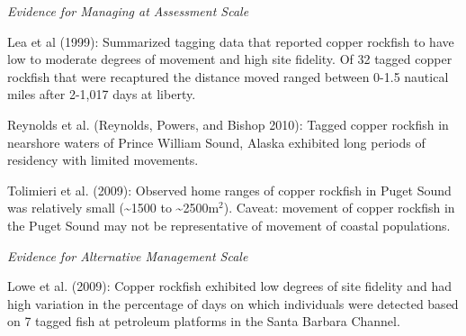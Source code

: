 \documentclass[11pt,
  english,
  a4paper,
]{article}
\begin{document}
\leavevmode\tagmcend\tagstructend


\emph{Evidence for Managing at Assessment Scale}

\leavevmode\tagmcend\tagstructend\par


Lea et al {(1999)\leavevmode\tagmcend\tagstructend}: Summarized tagging data that reported copper rockfish to have low to moderate degrees of movement and high site fidelity. Of 32 tagged copper rockfish that were recaptured the distance moved ranged between 0-1.5 nautical miles after 2-1,017 days at liberty.

\leavevmode\tagmcend\tagstructend\par


Reynolds et al. {(Reynolds, Powers, and Bishop 2010)\leavevmode\tagmcend\tagstructend}: Tagged copper rockfish in nearshore waters of Prince William Sound, Alaska exhibited long periods of residency with limited movements.

\leavevmode\tagmcend\tagstructend\par


Tolimieri et al. {(2009)\leavevmode\tagmcend\tagstructend}: Observed home ranges of copper rockfish in Puget Sound was relatively small (\textasciitilde1500 to \textasciitilde2500m{\(^2\)\leavevmode\tagmcend\tagstructend}). Caveat: movement of copper rockfish in the Puget Sound may not be representative of movement of coastal populations.

\leavevmode\tagmcend\tagstructend\par


\emph{Evidence for Alternative Management Scale}

\leavevmode\tagmcend\tagstructend\par


Lowe et al. {(2009)\leavevmode\tagmcend\tagstructend}: Copper rockfish exhibited low degrees of site fidelity and had high variation in the percentage of days on which individuals were detected based on 7 tagged fish at petroleum platforms in the Santa Barbara Channel.
\end{document}
